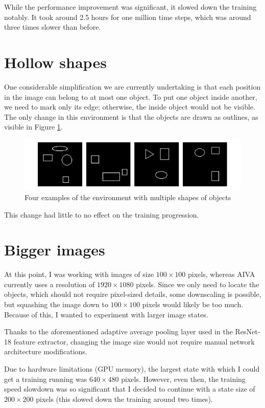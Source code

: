 \documentclass[
  digital,     %
  oneside,     %
  nosansbold,  %
  nocolorbold, %
  lof,         %
  lot,         %
]{fithesis4}
\begin{document}
While the performance improvement was significant, it slowed down the training notably. It took around 2.5 hours for one million time steps, which was around three times slower than before.

\section{Hollow shapes}
One considerable simplification we are currently undertaking is that each position in the image can belong to at most one object. To put one object inside another, we need to mark only its edge; otherwise, the inside object would not be visible. The only change in this environment is that the objects are drawn as outlines, as visible in Figure \ref{fig:env5}.

\begin{figure}
    \centering
    \includegraphics[width=1\linewidth]{env_examples/env5.pdf}
    \caption{Four examples of the environment with multiple shapes of objects}
    \label{fig:env5}
\end{figure}
 
This change had little to no effect on the training progression.

\section{Bigger images}
At this point, I was working with images of size $100\times100$ pixels, whereas AIVA currently uses a resolution of $1920\times1080$ pixels. Since we only need to locate the objects, which should not require pixel-sized details, some downscaling is possible, but squashing the image down to $100\times100$ pixels would likely be too much. Because of this, I wanted to experiment with larger image states.

Thanks to the aforementioned adaptive average pooling layer used in the ResNet-18 feature extractor, changing the image size would not require manual network architecture modifications.

Due to hardware limitations (GPU memory), the largest state with which I could get a training running was $640\times480$ pixels. However, even then, the training speed slowdown was so significant that I decided to continue with a state size of $200\times200$ pixels (this slowed down the training around two times).
\end{document}
